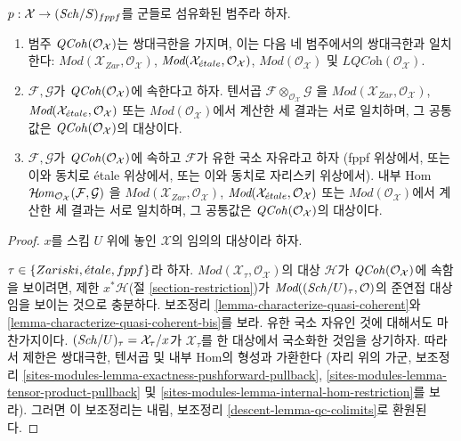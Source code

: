 \begin{lemma}
\label{lemma-qc-colimits}
$p : \mathcal{X} \to (\mathit{Sch}/S)_{fppf}$를 군들로 섬유화된 범주라 하자.
\begin{enumerate}
\item 범주 $\mathit{QCoh}(\mathcal{O}_\mathcal{X})$는 쌍대극한을 가지며,
이는 다음 네 범주에서의 쌍대극한과 일치한다:
$\textit{Mod}(\mathcal{X}_{Zar}, \mathcal{O}_\mathcal{X})$,
$\textit{Mod}(\mathcal{X}_{\acute{e}tale}, \mathcal{O}_\mathcal{X})$,
$\textit{Mod}(\mathcal{O}_\mathcal{X})$ 및
$\textit{LQCoh}(\mathcal{O}_\mathcal{X})$.
\item $\mathcal{F}, \mathcal{G}$가 $\mathit{QCoh}(\mathcal{O}_\mathcal{X})$에
속한다고 하자. 텐서곱
$\mathcal{F} \otimes_{\mathcal{O}_\mathcal{X}} \mathcal{G}$
을
$\textit{Mod}(\mathcal{X}_{Zar}, \mathcal{O}_\mathcal{X})$,
$\textit{Mod}(\mathcal{X}_{\acute{e}tale}, \mathcal{O}_\mathcal{X})$ 또는
$\textit{Mod}(\mathcal{O}_\mathcal{X})$에서 계산한 세 결과는
서로 일치하며, 그 공통값은
$\mathit{QCoh}(\mathcal{O}_\mathcal{X})$의 대상이다.
\item $\mathcal{F}, \mathcal{G}$가 $\mathit{QCoh}(\mathcal{O}_\mathcal{X})$에
속하고 $\mathcal{F}$가 유한 국소 자유라고 하자
(fppf 위상에서, 또는 이와 동치로 \'etale 위상에서, 또는 이와
동치로 자리스키 위상에서). 내부 Hom
$\mathop{\mathcal{H}\!\mathit{om}}\nolimits_{\mathcal{O}_\mathcal{X}}(\mathcal{F}, \mathcal{G})$
을
$\textit{Mod}(\mathcal{X}_{Zar}, \mathcal{O}_\mathcal{X})$,
$\textit{Mod}(\mathcal{X}_{\acute{e}tale}, \mathcal{O}_\mathcal{X})$ 또는
$\textit{Mod}(\mathcal{O}_\mathcal{X})$에서 계산한 세 결과는
서로 일치하며, 그 공통값은
$\mathit{QCoh}(\mathcal{O}_\mathcal{X})$의 대상이다.
\end{enumerate}
\end{lemma}

\begin{proof}
$x$를 스킴 $U$ 위에 놓인 $\mathcal{X}$의 임의의 대상이라 하자.\par\noindent
$\tau \in \{Zariski, {\acute{e}tale}, fppf\}$라 하자.
$\textit{Mod}(\mathcal{X}_\tau, \mathcal{O}_\mathcal{X})$의 대상
$\mathcal{H}$가 $\mathit{QCoh}(\mathcal{O}_\mathcal{X})$에 속함을 보이려면,
제한 $x^*\mathcal{H}$(절 \ref{section-restriction})가
$\textit{Mod}((\mathit{Sch}/U)_\tau, \mathcal{O})$의 준연접 대상임을
보이는 것으로 충분하다. 보조정리
\ref{lemma-characterize-quasi-coherent}와
\ref{lemma-characterize-quasi-coherent-bis}를 보라.
유한 국소 자유인 것에 대해서도 마찬가지이다.
$(\mathit{Sch}/U)_\tau = \mathcal{X}_\tau/x$가
$\mathcal{X}_\tau$를 한 대상에서 국소화한 것임을 상기하자.
따라서 제한은 쌍대극한, 텐서곱 및 내부 Hom의 형성과 가환한다
(자리 위의 가군, 보조정리
\ref{sites-modules-lemma-exactness-pushforward-pullback},
\ref{sites-modules-lemma-tensor-product-pullback} 및
\ref{sites-modules-lemma-internal-hom-restriction}를 보라).
그러면 이 보조정리는 내림, 보조정리
\ref{descent-lemma-qc-colimits}로 환원된다.
\end{proof}






